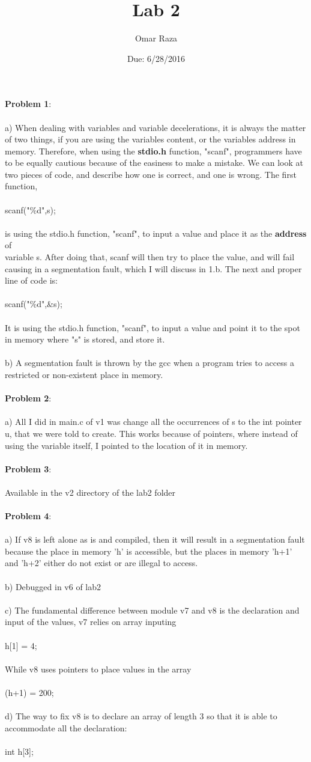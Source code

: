\documentclass[12pt]{article}
\title{\vspace{-2.0cm} Lab 2}
\author{Omar Raza}
\date{Due: 6/28/2016}
\newcommand{\tab}[0]{\indent \indent}
\newcommand{\enter}[0]{\\ \tab}
\newcommand{\nextline}[0]{\\ \enter}
\newcommand{\codeindent}[0]{\\ \enter \indent}
\begin{document}
\maketitle
\noindent
\textbf{Problem 1}: \nextline a) When dealing with variables and variable decelerations, it is always the matter \tab of two things, if you are using the variables content, or the variables address in \tab memory. Therefore, when using the \textbf{stdio.h} function, "scanf", programmers have to \tab be equally cautious because of the easiness to make a mistake. We can look at two \tab pieces of code, and describe how one is correct, and one is wrong. The first function, \codeindent  scanf("\%d",s); \nextline is using the stdio.h function, "scanf", to input a value and place it as the \textbf{address} of \enter variable s. After doing that, scanf will then try to place the value, and will fail causing \tab in a segmentation fault, which I will discuss in 1.b. The next and proper line of code is: \codeindent scanf("\%d",\&s);\\ \enter It is using the stdio.h function, "scanf", to input a value and point it to the spot \tab in memory where "s" is stored, and store it. \\\\
\tab b) A segmentation fault is thrown by the gcc when a program tries to access a \enter restricted or non-existent place in memory. \\ \\
\textbf{Problem 2}: \nextline a) All I did in main.c of v1 was change all the occurrences of s to the int pointer \tab *u, that we were told to create. This works because of pointers, where instead of \tab using the variable itself, I pointed to the location of it in memory. \\\\ 
\textbf{Problem 3}: \nextline Available in the v2 directory of the lab2 folder \\\\
\textbf{Problem 4}: \nextline a) If v8 is left alone as is and compiled, then it will result in a segmentation fault \tab because the place in memory 'h' is accessible, but the places in memory 'h+1' and \tab 'h+2' either do not exist or are illegal to access. \nextline
	b) Debugged in v6 of lab2 \nextline
	c) The fundamental difference between module v7 and v8 is the declaration and \tab input of the values, v7 relies on array inputing \codeindent h[1] = 4; \nextline  While v8 uses pointers to place values in the array \codeindent *(h+1) = 200; \nextline 
	d) The way to fix v8 is to declare an array of length 3 so that it is able to \enter accommodate all the declaration: \codeindent int h[3]; \\\\
\end{document}
